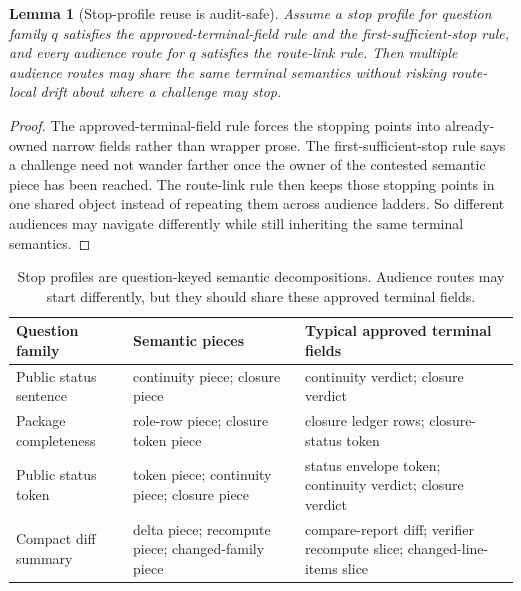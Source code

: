\documentclass[11pt]{article}
\newtheorem{lemma}{Lemma}
\begin{document}
\begin{lemma}[Stop-profile reuse is audit-safe]
Assume a stop profile for question family $q$ satisfies the approved-terminal-field rule and the first-sufficient-stop rule, and every audience route for $q$ satisfies the route-link rule.
Then multiple audience routes may share the same terminal semantics without risking route-local drift about where a challenge may stop.
\end{lemma}

\begin{proof}
The approved-terminal-field rule forces the stopping points into already-owned narrow fields rather than wrapper prose.
The first-sufficient-stop rule says a challenge need not wander farther once the owner of the contested semantic piece has been reached.
The route-link rule then keeps those stopping points in one shared object instead of repeating them across audience ladders.
So different audiences may navigate differently while still inheriting the same terminal semantics.
\end{proof}

\begin{table}[t]
\centering
\small
\begin{tabularx}{\linewidth}{@{}l X X@{}}
\toprule
Question family & Semantic pieces & Typical approved terminal fields \\
\midrule
Public status sentence & continuity piece; closure piece & continuity verdict; closure verdict \\
Package completeness & role-row piece; closure token piece & closure ledger rows; closure-status token \\
Public status token & token piece; continuity piece; closure piece & status envelope token; continuity verdict; closure verdict \\
Compact diff summary & delta piece; recompute piece; changed-family piece & compare-report diff; verifier recompute slice; changed-line-items slice \\
\bottomrule
\end{tabularx}
\caption{Stop profiles are question-keyed semantic decompositions. Audience routes may start differently, but they should share these approved terminal fields.}
\label{tab:stopprofiles}
\end{table}
\end{document}
